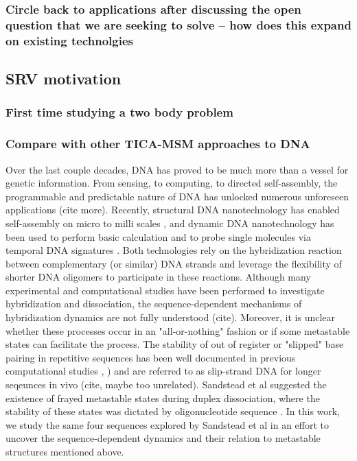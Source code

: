 \documentclass[journal=jpcbfk,manuscript=article]{achemso}
\begin{document}
\subsubsection{\label{sec:intro}Circle back to applications after discussing the open question that we are seeking to solve -- how does this expand on existing technolgies}

\subsection{\label{sec:intro}SRV motivation}
\subsubsection{\label{sec:intro}First time studying a two body problem}
\subsubsection{\label{sec:intro}Compare with other TICA-MSM approaches to DNA}

Over the last couple decades, DNA has proved to be much more than a vessel for genetic information. From sensing, to computing, to directed self-assembly, the programmable and predictable nature of DNA has unlocked numerous unforeseen applications \citep{Seeman2017DNANanotechnology} (cite more). Recently, structural DNA nanotechnology has enabled self-assembly on micro to milli scales \citep{MhatreV.HoJi-AnnLee2012NIHAccess}, and dynamic DNA nanotechnology has been used to perform basic calculation \citep{Bui2018} and to probe single molecules via temporal DNA signatures \citep{Shah2019}. Both technologies rely on the hybridization reaction between complementary (or similar) DNA strands and leverage the flexibility of shorter DNA oligomers to participate in these reactions. Although many experimental and computational studies have been performed to investigate hybridization and dissociation, the sequence-dependent mechanisms of hybridization dynamics are not fully understood (cite). Moreover, it is unclear whether these processes occur in an "all-or-nothing" fashion or if some metastable states can facilitate the process. The stability of out of register or "slipped" base pairing in repetitive sequences has been well documented in previous computational studies \citep{Phys2014}, \citep{Xiao2019}) and are referred to as slip-strand DNA for longer seqeunces in vivo (cite, maybe too unrelated). Sandstead et al suggested the existence of frayed metastable states during duplex dissociation, where the stability of these states was dictated by oligonucleotide sequence \citep{Sanstead2016}. In this work, we study the same four sequences explored by Sandstead et al in an effort to uncover the sequence-dependent dynamics and their relation to  metastable structures mentioned above.
\end{document}
